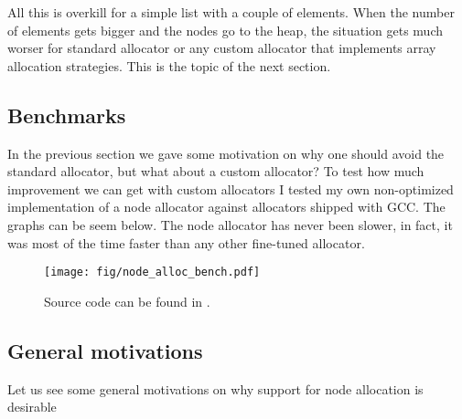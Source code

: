 \documentclass[11pt]{article}
\begin{document}
All this is overkill for a simple list with a couple of elements. When the number
of elements gets bigger and the nodes go to the heap, the situation gets much
worser for standard allocator or any custom allocator that implements array allocation
strategies. This is the topic of the next section.

\subsection{Benchmarks}

In the previous section we gave some motivation on why one should avoid
the standard allocator, but what about a custom allocator? To test how much
improvement we can get with custom allocators I tested my own non-optimized
implementation of a node allocator against allocators shipped with GCC.
The graphs can be seem below. The node allocator has never been slower,
in fact, it was most of the time faster than any other fine-tuned allocator.

\begin{figure}[ht]
    \centering
    \texttt{[image: fig/node\_alloc\_bench.pdf]}
    \caption[Benchmark]
    {Source code can be found in \cite{rtcpp}.}
    \label{fig::bench}
\end{figure}



\subsection{General motivations}

Let us see some general motivations on why support for node allocation is
desirable
\end{document}
